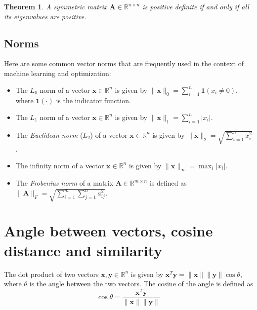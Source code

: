 \documentclass[11pt]{book} %
\newtheorem{theorem}{Theorem}[section]
\begin{document}
\begin{theorem}
A symmetric matrix \(\mathbf{A} \in \mathbb{R}^{n \times n}\) is positive definite if and only if all its eigenvalues are positive.
\end{theorem}

\subsection{Norms}
Here are some common vector norms that are frequently used in the context of machine learning and optimization:
\begin{itemize}
    \item The $L_0$ norm of a vector \(\mathbf{x} \in \mathbb{R}^n\) is given by \(\lVert \mathbf{x} \rVert_0 = \sum_{i=1}^{n} \mathbf{1}(x_i \neq 0)\), where \(\mathbf{1}(\cdot)\) is the indicator function.
    \item The $L_1$ norm of a vector \(\mathbf{x} \in \mathbb{R}^n\) is given by \(\lVert \mathbf{x} \rVert_1 = \sum_{i=1}^{n} \lvert x_i \rvert\).
    \item The \textit{Euclidean norm} ($L_2$) of a vector \(\mathbf{x} \in \mathbb{R}^n\) is given by \(\lVert \mathbf{x} \rVert_2 = \sqrt{\sum_{i=1}^{n} x_i^2}\).
    \item The infinity norm of a vector \(\mathbf{x} \in \mathbb{R}^n\) is given by \(\lVert \mathbf{x} \rVert_{\infty} = \max_{i} \lvert x_i \rvert\).
    \item The \textit{Frobenius norm} of a matrix \(\mathbf{A} \in \mathbb{R}^{m \times n}\) is defined as \(\lVert \mathbf{A} \rVert_F = \sqrt{\sum_{i=1}^{m} \sum_{j=1}^{n} a_{ij}^2}\).
\end{itemize}

\section{Angle between vectors, cosine distance and similarity}

The dot product of two vectors $\mathbf{x}, \mathbf{y} \in \mathbb{R}^n$ is given by $\mathbf{x}^T \mathbf{y} = \lVert \mathbf{x} \rVert \lVert \mathbf{y} \rVert \cos \theta$, 
where $\theta$ is the angle between the two vectors. The cosine of the angle is defined as \\
\begin{equation}
    \cos \theta = \frac{\mathbf{x}^T \mathbf{y}}{\lVert \mathbf{x} \rVert \lVert \mathbf{y} \rVert}
\end{equation}
\end{document}
